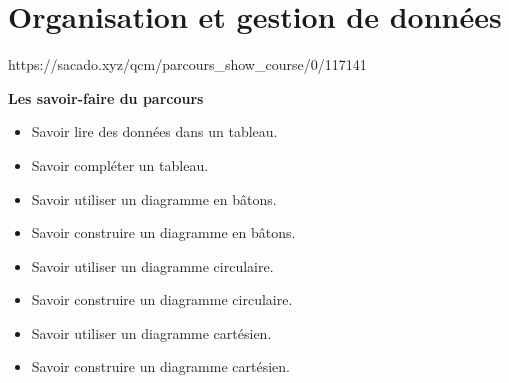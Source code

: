\chapter{Organisation et gestion de données}
{https://sacado.xyz/qcm/parcours_show_course/0/117141}
{\begin{CpsCol}
 \textbf{Les savoir-faire du parcours}
 \begin{itemize}
 \item Savoir lire des données dans un tableau.
 \item Savoir compléter un tableau.
 \item Savoir utiliser un diagramme en bâtons.
 \item Savoir construire un diagramme en bâtons.
 \item Savoir utiliser un diagramme circulaire.
 \item Savoir construire un diagramme circulaire.
 \item Savoir utiliser un diagramme cartésien.
 \item Savoir construire un diagramme cartésien.
 \end{itemize}
\end{CpsCol}
}

